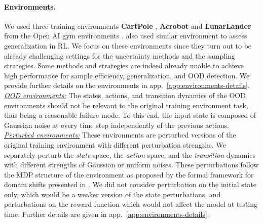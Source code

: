 \paragraph{Environments.} We used three training environments \textbf{CartPole} \cite{cartpole}, \textbf{Acrobot} \cite{acrobot1, acrobot2} and \textbf{LunarLander} \cite{lunarlander1} from the Open AI gym environments \cite{gym}. \cite{assessing-generalization-rl} also used similar environment to assess generalization in RL. We focus on these environments since they turn out to be already challenging settings for the uncertainty methods and the sampling strategies. Some methods and strategies are indeed already unable to achieve high performance for sample efficiency, generalization, and OOD detection. We provide further details on the environments in app.~\ref{app:environments-details}. \textit{\underline{OOD environments:}} The states, actions, and transition dynamics of the OOD environments should not be relevant to the original training environment task, thus being a reasonable failure mode. To this end, the input state is composed of Gaussian noise at every time step independently of the previous actions. \textit{\underline{Perturbed environments:}} These environments are perturbed versions of the original training environment with different perturbation strengths. We separately perturb the \emph{state} space, the \emph{action} space, and the \emph{transition} dynamics with different strengths of Gaussian or uniform noises. These perturbations follow the MDP structure of the environment as proposed by the formal framework for domain shifts presented in \cite{domain-shifts-rl}. We did not consider perturbation on the initial state only, which would be a weaker version of the state perturbations, and perturbations on the reward function which would not affect the model at testing time. Further details are given in app.~\ref{app:environments-details}.

